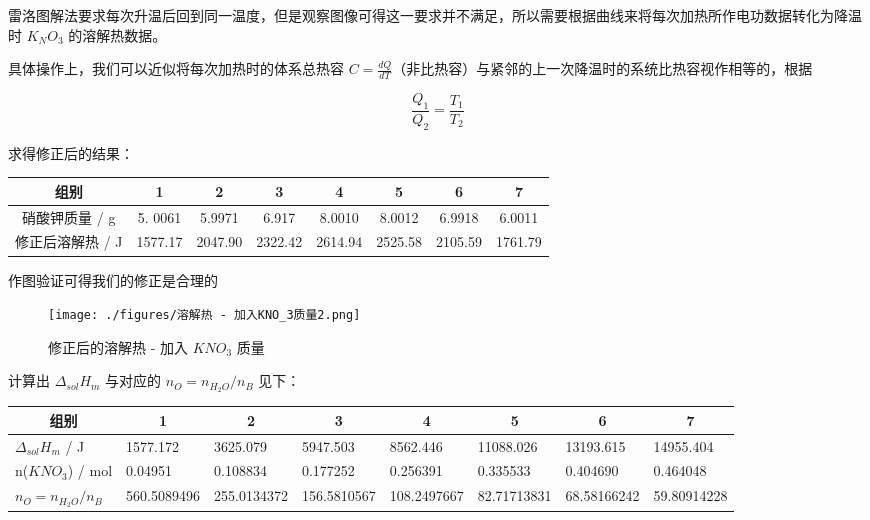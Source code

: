 \documentclass[4pt,a4papper]{article}
\begin{document}
雷洛图解法要求每次升温后回到同一温度，但是观察图像可得这一要求并不满足，所以需要根据曲线来将每次加热所作电功数据转化为降温时 $K_NO_3$ 的溶解热数据。

具体操作上，我们可以近似将每次加热时的体系总热容 $C = \frac{dQ}{dT}$（非比热容）与紧邻的上一次降温时的系统比热容视作相等的，根据

$$\frac{Q_1}{Q_2} = \frac{T_1}{T_2}$$

求得修正后的结果：
\begin{table}[htbp]
\begin{tabular}{|c|c|c|c|c|c|c|c|}
\hline
组别                               & 1                            & 2                            & 3                            & 4                            & 5                            & 6                            & 7                            \\ \hline
硝酸钾质量 / g                        & 5. 0061                      & 5.9971                       & 6.917                        & 8.0010                       & 8.0012                       & 6.9918                       & 6.0011                       \\ \hline
\multicolumn{1}{|l|}{修正后溶解热 / J} & \multicolumn{1}{l|}{1577.17} & \multicolumn{1}{l|}{2047.90} & \multicolumn{1}{l|}{2322.42} & \multicolumn{1}{l|}{2614.94} & \multicolumn{1}{l|}{2525.58} & \multicolumn{1}{l|}{2105.59} & \multicolumn{1}{l|}{1761.79} \\ \hline
\end{tabular}
\end{table}

作图验证可得我们的修正是合理的
    \begin{figure}[htbp]
        \centering
        \texttt{[image: ./figures/溶解热 - 加入KNO\_3质量2.png]}
        \caption{修正后的溶解热 - 加入 $KNO_3$ 质量} \label{fig:2}
    \end{figure}

计算出 $\Delta_{sol}H_m$ 与对应的 $n_O = n_{H_2O}/n_B$ 见下：
\begin{table}[htbp]
\begin{tabular}{|l|l|l|l|l|l|l|l|}
\hline
\multicolumn{1}{|c|}{组别} & \multicolumn{1}{c|}{1} & \multicolumn{1}{c|}{2} & \multicolumn{1}{c|}{3} & \multicolumn{1}{c|}{4} & \multicolumn{1}{c|}{5} & \multicolumn{1}{c|}{6} & \multicolumn{1}{c|}{7} \\ \hline
$\Delta_{sol}H_m$ / J    & 1577.172               & 3625.079               & 5947.503               & 8562.446               & 11088.026              & 13193.615              & 14955.404              \\ \hline
n($KNO_3$) / mol         & 0.04951                & 0.108834               & 0.177252               & 0.256391               & 0.335533               & 0.404690               & 0.464048               \\ \hline
$n_O = n_{H_2O}/n_B$     & 560.5089496            & 255.0134372            & 156.5810567            & 108.2497667            & 82.71713831            & 68.58166242            & 59.80914228            \\ \hline
\end{tabular}
\end{table}
\end{document}
